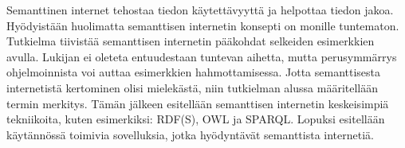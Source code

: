 \documentclass[finnish, 12pt, a4paper, elec, utf8, pdfa, online]{aaltothesis}
\date{24.4.2018}
\begin{document}
\makecoverpage

\makecopyrightpage

\begin{abstractpage}[finnish]
Semanttinen internet tehostaa tiedon käytettävyyttä ja helpottaa tiedon jakoa. Hyödyistään huolimatta semanttisen internetin konsepti on monille tuntematon. Tutkielma tiivistää semanttisen internetin pääkohdat selkeiden esimerkkien avulla. Lukijan ei oleteta entuudestaan tuntevan aihetta, mutta perusymmärrys ohjelmoinnista voi auttaa esimerkkien hahmottamisessa. Jotta semanttisesta internetistä kertominen olisi mielekästä, niin tutkielman alussa määritellään termin merkitys. Tämän jälkeen esitellään semanttisen internetin keskeisimpiä tekniikoita, kuten esimerkiksi: RDF(S), OWL ja SPARQL. Lopuksi esitellään käytännössä toimivia sovelluksia, jotka hyödyntävät semanttista internetiä.
\end{abstractpage}


\newpage








\newpage
\end{document}
